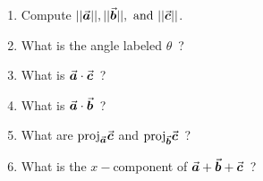 \begin{enumerate}

\item Compute \(||\a||, ||\b||, \text{ and } ||\c||\).

\vfill

\item What is the angle labeled \(\theta\)\ ?

\vfill

\item What is \(\a \cdot \c\)\ ?

\vfill

\item What is \(\a \cdot \b\)\ ?

\vfill

\item What are \(\text{proj}_{\a} \c\) and \(\text{proj}_{\b} \c\)\ ?

\vfill

\item What is the \(x-\)component of \(\a+\b+\c\)\ ?

\vfill


\end{enumerate}


